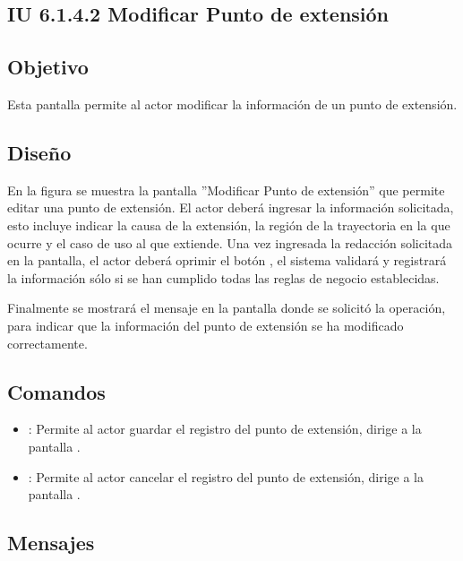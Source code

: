 \subsection{IU 6.1.4.2 Modificar Punto de extensión}

\subsection{Objetivo}
	Esta pantalla permite al actor modificar la información de un punto de extensión.
\subsection{Diseño}
	En la figura  se muestra la pantalla ''Modificar Punto de extensión'' que permite editar una punto de extensión. El actor deberá ingresar la información solicitada, esto incluye indicar la causa de la extensión, la región de la trayectoria en la que ocurre y el caso de uso al que extiende.
	Una vez ingresada la redacción solicitada en la pantalla, el actor deberá oprimir el botón , el sistema validará y registrará la información sólo si se han cumplido todas las reglas de negocio establecidas.
	
	Finalmente se mostrará el mensaje  en la pantalla donde se solicitó la operación, para indicar que la información del punto de extensión se ha modificado correctamente.

\subsection{Comandos}
\begin{itemize}
	\item {}: Permite al actor guardar el registro del punto de extensión, dirige a la pantalla .
	\item {}: Permite al actor cancelar el registro del punto de extensión, dirige a la pantalla .
\end{itemize}

\subsection{Mensajes}

